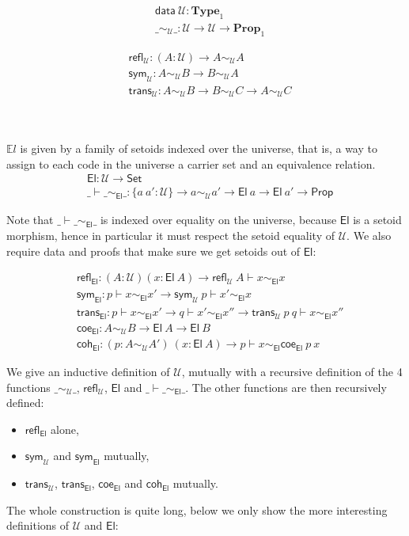 \documentclass{easychair}
\newcommand{\setoidU}{\mathcal{U}}
\newcommand{\Set}{\textsf{Set}}
\newcommand{\mType}{\mathbf{Type}}
\newcommand{\Prop}{\textsf{Prop}}
\newcommand{\mProp}{\mathbf{Prop}}
\newcommand{\El}{\textsf{El}}
\newcommand{\EL}{\mathds{E}l}
\newcommand{\reflu}{\textsf{refl}_\setoidU}
\newcommand{\symu}{\textsf{sym}_\setoidU}
\newcommand{\transu}{\textsf{trans}_\setoidU}
\newcommand{\coeel}{\textsf{coe}_\El}
\newcommand{\cohel}{\textsf{coh}_\El}
\newcommand{\equ}[2]{#1 \sim_\setoidU #2}
\newcommand{\eqel}[3]{#1 \vdash #2 \sim_\El #3}
\begin{document}
\begin{minipage}{0.5\textwidth}
\begin{align*}
  & \textsf{data} \ \setoidU : \mType_1 \\
  & \_\sim_\setoidU\_ : \setoidU \to \setoidU \to \mProp_1
\end{align*}
\end{minipage}
\begin{minipage}{0.5\textwidth}
\begin{align*}
  & \textsf{refl}_\setoidU : (A : \setoidU) \to \equ{A}{A} \\
  & \textsf{sym}_\setoidU : \equ{A}{B} \to \equ{B}{A} \\
  & \textsf{trans}_\setoidU : \equ{A}{B} \to \equ{B}{C} \to \equ{A}{C}
\end{align*}
\end{minipage}
\\
~
\\

$\EL$ is given by a family of setoids indexed over the universe, that is, a way
to assign to each code in the universe a carrier set and an equivalence
relation.
%
\begin{align*}
  & \El : \setoidU \to \Set \\
  & \_\vdash\_\sim_\El\_ : \{a\ a' : \setoidU\} \to a \sim_\setoidU a' \to \El\ a \to \El\ a' \to \Prop
\end{align*}

Note that $\eqel{\_}{\_}{\_}$ is indexed over equality on the universe, because
$\El$ is a setoid morphism, hence in particular it must respect the setoid
equality of $\setoidU$.
%
We also require data and proofs that make sure we get setoids out of $\El$:

\begin{align*}
  & \textsf{refl}_\El : (A : \setoidU) (x : \El\ A) \to \eqel{\reflu\ A}{x}{x} \\
  & \textsf{sym}_\El : \eqel{p}{x}{x'} \to \eqel{\symu\ p}{x'}{x} \\
  & \textsf{trans}_\El : \eqel{p}{x}{x'} \to \eqel{q}{x'}{x''} \to \eqel{\transu\ p\ q}{x}{x''} \\
  & \coeel : \equ{A}{B} \to \El\ A \to \El\ B \\
  & \cohel : (p : \equ{A}{A'}) \ (x : \El\ A) \to \eqel{p}{x}{\coeel\ p\ x}
\end{align*}

We give an inductive definition of $\setoidU$, mutually with a recursive definition
of the 4 functions
$\_\sim_\setoidU\_$, $\textsf{refl}_\setoidU$, $\El$ and $\_\vdash\_\sim_\El\_$.
The other functions are then recursively defined:
\begin{itemize}
\item $\textsf{refl}_\El$ alone,
\item $\textsf{sym}_\setoidU$ and $\textsf{sym}_\El$ mutually,
\item $\textsf{trans}_\setoidU$, $\textsf{trans}_\El$, $\coeel$ and $\cohel$ mutually.
\end{itemize}
The whole construction is quite long, below we only show the more interesting
definitions of $\setoidU$ and $\El$:
\end{document}
